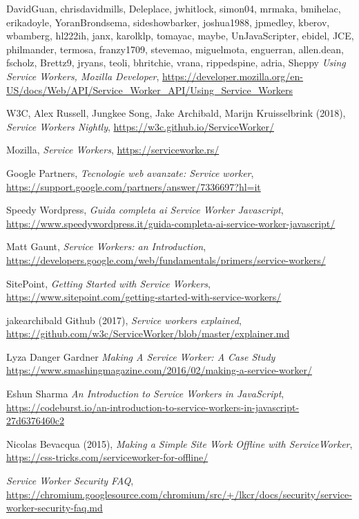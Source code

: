 \documentclass[11pt ,a4paper , twoside , openright ]{article}
\begin{document}
\begin{thebibliography}{99}
	\bibitem{}
	DavidGuan, chrisdavidmills, Deleplace, jwhitlock, simon04, mrmaka, bmihelac, erikadoyle, YoranBrondsema, sideshowbarker, joshua1988, jpmedley, kberov, wbamberg, hl222ih, janx, karolklp, tomayac, maybe, UnJavaScripter, ebidel, JCE, philmander, termosa, franzy1709, stevemao, miguelmota, enguerran, allen.dean, fscholz, Brettz9, jryans, teoli, bhritchie, vrana, rippedspine, adria, Sheppy
	\emph{Using Service Workers, Mozilla Developer},
	\url{https://developer.mozilla.org/en-US/docs/Web/API/Service_Worker_API/Using_Service_Workers}
	
	\bibitem{}
	W3C, Alex Russell, Jungkee Song, Jake Archibald, Marijn Kruisselbrink (2018),
	\emph{Service Workers Nightly},
	\url{https://w3c.github.io/ServiceWorker/}
	
	\bibitem{}
	Mozilla,
	\emph{Service Workers},
	\url{https://serviceworke.rs/}
	
	\bibitem{}
	Google Partners,
	\emph{Tecnologie web avanzate: Service worker},
	\url{https://support.google.com/partners/answer/7336697?hl=it}
	
	\bibitem{}
	Speedy Wordpress,
	\emph{Guida completa ai Service Worker Javascript},
	\url{https://www.speedywordpress.it/guida-completa-ai-service-worker-javascript/}
	
	\bibitem{}
	Matt Gaunt,
	\emph{Service Workers: an Introduction},
	\url{https://developers.google.com/web/fundamentals/primers/service-workers/}
	
	\bibitem{}
	SitePoint,
	\emph{Getting Started with Service Workers},
	\url{https://www.sitepoint.com/getting-started-with-service-workers/}
	
	\bibitem{}
	jakearchibald Github (2017),
	\emph{Service workers explained},
	\url{https://github.com/w3c/ServiceWorker/blob/master/explainer.md}
	
	\bibitem{}
	Lyza Danger Gardner
	\emph{Making A Service Worker: A Case Study}
	\url{https://www.smashingmagazine.com/2016/02/making-a-service-worker/}
	
	\bibitem{}
	Eshun Sharma
	\emph{An Introduction to Service Workers in JavaScript},
	\url{https://codeburst.io/an-introduction-to-service-workers-in-javascript-27d6376460c2}
	
	\bibitem{}
	Nicolas Bevacqua (2015), 
	\emph{Making a Simple Site Work Offline with ServiceWorker},
	\url{https://css-tricks.com/serviceworker-for-offline/}
	
	\bibitem{}
	\emph{Service Worker Security FAQ},
	\url{https://chromium.googlesource.com/chromium/src/+/lkcr/docs/security/service-worker-security-faq.md}
\end{thebibliography}
\end{document}
